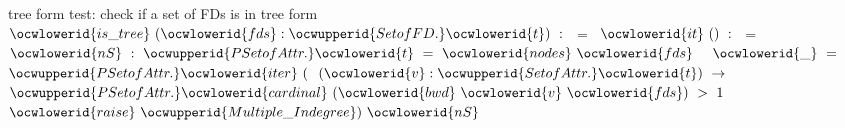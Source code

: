 \documentclass[12pt]{article}
\begin{document}
\ocwendcode{}\ocwindent{0.00em}
tree form test: check if a set of FDs is in tree form 
\ocweol
\label{rellens.ml:10106}%
\medskip
\ocwbegincode{}\ocwindent{0.00em}
~$\ocwlowerid{is\_tree}~(\ocwlowerid{fds}:\ocwupperid{SetofFD.}\ocwlowerid{t})~:~$~=\ocweol
\ocwindent{1.00em}
~$\ocwlowerid{it}~()~:~$~=\ocweol
\ocwindent{2.00em}
~$\ocwlowerid{nS}~:~\ocwupperid{PSetofAttr.}\ocwlowerid{t}~=~\ocwlowerid{nodes}~\ocwlowerid{fds}~$\ocweol
\ocwindent{2.00em}
~$\ocwlowerid{\_}~=~$\ocweol
\ocwindent{3.00em}
$\ocwupperid{PSetofAttr.}\ocwlowerid{iter}~($~$(\ocwlowerid{v}:\ocwupperid{SetofAttr.}\ocwlowerid{t})~\rightarrow{}$\ocweol
\ocwindent{5.00em}
~$\ocwupperid{PSetofAttr.}\ocwlowerid{cardinal}~(\ocwlowerid{bwd}~\ocwlowerid{v}~\ocwlowerid{fds})~>~1~$~$\ocwlowerid{raise}~\ocwupperid{Multiple\_Indegree})~\ocwlowerid{nS}~$\medskip
\end{document}
